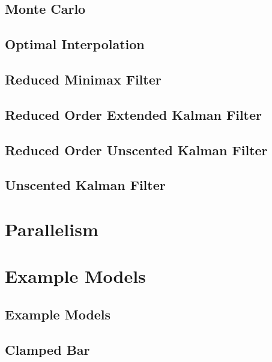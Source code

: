 \documentclass{book}
\begin{document}
\chapter{Monte Carlo}
\label{monte_carlo}
\hypertarget{monte_carlo}{}

\chapter{Optimal Interpolation}
\label{optimal_interpolation}
\hypertarget{optimal_interpolation}{}

\chapter{Reduced Minimax Filter}
\label{reduced_minimax_filter}
\hypertarget{reduced_minimax_filter}{}

\chapter{Reduced Order Extended Kalman Filter}
\label{reduced_order_extended_kalman_filter}
\hypertarget{reduced_order_extended_kalman_filter}{}

\chapter{Reduced Order Unscented Kalman Filter}
\label{reduced_order_unscented_kalman_filter}
\hypertarget{reduced_order_unscented_kalman_filter}{}

\chapter{Unscented Kalman Filter}
\label{unscented_kalman_filter}
\hypertarget{unscented_kalman_filter}{}

\part{Parallelism}

\part{Example Models}
\chapter{Example Models}
\label{example_models}
\hypertarget{example_models}{}

\chapter{Clamped Bar}
\label{clamped_bar_model}
\hypertarget{clamped_bar_model}{}

\end{document}
